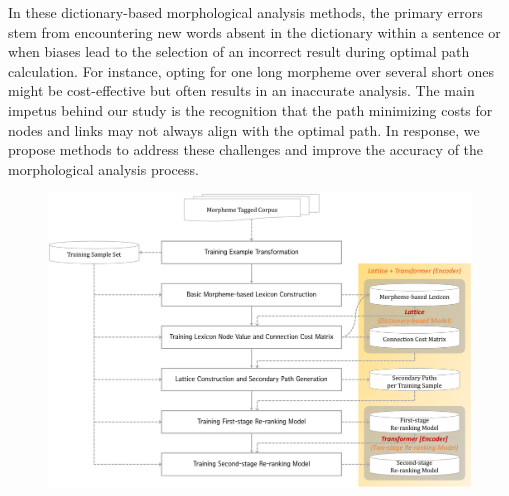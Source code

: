 \documentclass[AMS,STIX2COL]{WileyNJD-v2}
\begin{document}
    In these dictionary-based morphological analysis methods, the primary errors stem from encountering new words absent in the dictionary within a sentence or when biases lead to the selection of an incorrect result during optimal path calculation.
    For instance, opting for one long morpheme over several short ones might be cost-effective but often results in an inaccurate analysis.
    The main impetus behind our study is the recognition that the path minimizing costs for nodes and links may not always align with the optimal path.
    In response, we propose methods to address these challenges and improve the accuracy of the morphological analysis process.

    \begin{figure}[ht]
        \centerline{\includegraphics[width=1.0\textwidth]{fig;block-v1}}

\end{figure}
\end{document}
